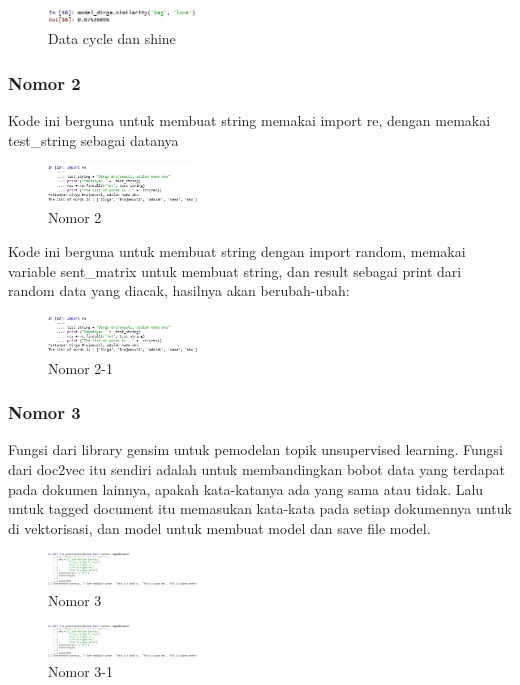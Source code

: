 \hfill\break
\begin{figure}[H]
\includegraphics[width=4cm]{figures/1174067/5/hasil1-13.jpg}
\centering
\caption{Data cycle dan shine}
\end{figure}


\subsubsection{Nomor 2}
\hfill\break

Kode ini berguna untuk membuat string memakai import re, dengan memakai test\_string sebagai datanya
\begin{figure}[H]
\includegraphics[width=4cm]{figures/1174067/5/hasil2.jpg}
\centering
\caption{Nomor 2}
\end{figure}

Kode ini berguna untuk membuat string dengan import random, memakai variable sent\_matrix untuk membuat string, dan result sebagai print dari random data yang diacak, hasilnya akan berubah-ubah:
\begin{figure}[H]
\includegraphics[width=4cm]{figures/1174067/5/hasil2.jpg}
\centering
\caption{Nomor 2-1}
\end{figure}

\subsubsection{Nomor 3}
\hfill\break

Fungsi dari library gensim untuk pemodelan topik unsupervised learning. Fungsi dari doc2vec itu sendiri adalah untuk membandingkan bobot data yang terdapat pada dokumen lainnya, apakah kata-katanya ada yang sama atau tidak. Lalu untuk tagged document itu memasukan kata-kata pada setiap dokumennya untuk di vektorisasi, dan model untuk membuat model dan save file model.
\begin{figure}[H]
\includegraphics[width=4cm]{figures/1174067/5/hasil3.jpg}
\centering
\caption{Nomor 3}
\end{figure}

\begin{figure}[H]
\includegraphics[width=4cm]{figures/1174067/5/hasil3.jpg}
\centering
\caption{Nomor 3-1}
\end{figure}	

